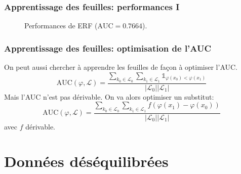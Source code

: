 \documentclass[dvipsnames,10pt]{beamer}
\theoremstyle{plain}
\theoremstyle{definition}
\begin{document}
\begin{frame}
\frametitle{Apprentissage des feuilles: performances I}
\begin{figure}[H]
    \caption{Performances de ERF ($\mathrm{AUC} = 0.7664$).}
\end{figure}
\end{frame}

\begin{frame}
\frametitle{Apprentissage des feuilles: optimisation de l'AUC}
On peut aussi chercher à apprendre les feuilles de façon à optimiser l'AUC.
\begin{equation*}
    \mathrm{AUC} ( \varphi , \mathcal{L} ) = \frac{\sum_{k_0 \in \mathcal{L_0}} \sum_{k_1 \in \mathcal{L_1}} \mathds{1}_{\varphi(x_0) < \varphi(x_1)} }{\vert \mathcal{L}_0 \vert \vert \mathcal{L}_1 \vert }
\end{equation*}
Mais l'AUC n'est pas dérivable. On va alors optimiser un substitut:
\begin{equation*}
    \mathrm{AUC} ( \varphi , \mathcal{L} ) = \frac{\sum_{k_0 \in \mathcal{L_0}} \sum_{k_1 \in \mathcal{L_1}} f \left( \varphi(x_1) - \varphi(x_0) \right) }{\vert \mathcal{L}_0 \vert \vert \mathcal{L}_1 \vert }
\end{equation*}
avec $f$ dérivable.
\end{frame}

\section{Données déséquilibrées}
\end{document}
